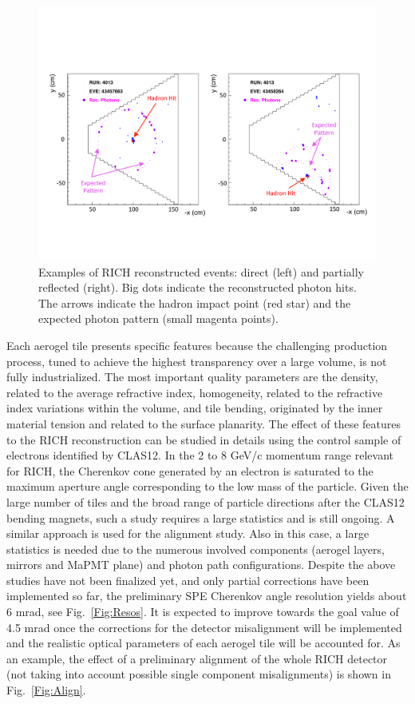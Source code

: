 \documentclass[final,5p,times,twocolumn]{elsarticle}
\def\MAPMT{MaPMT }
\begin{document}
\begin{figure}[t]
\begin{center}
\includegraphics[width=1.0\columnwidth]{EPS/Figure7.pdf}
\end{center}
\caption{Examples of RICH reconstructed events: direct (left) and partially reflected (right). Big dots indicate
the reconstructed photon hits. The arrows indicate
the hadron impact point (red star) and the expected photon pattern (small magenta points).}
\label{Fig:Events}
\end{figure}

Each aerogel tile presents specific features because the challenging production process, tuned to achieve
the highest transparency over a large volume, is not fully industrialized. The most important quality 
parameters are the density, related to the average refractive index, homogeneity, related to the 
refractive index variations within the volume, and tile bending, originated by the inner material tension 
and related to the surface planarity. The effect of these features to the RICH reconstruction can 
be studied in details using the control sample of electrons identified by CLAS12. In the 2 to 8 GeV/c 
momentum range relevant for RICH, the Cherenkov cone generated by an electron is saturated to the maximum 
aperture angle corresponding to the low mass of the particle. Given the large number of tiles and the
broad range of particle directions after the CLAS12 bending magnets, such a study requires a large
statistics and is still ongoing. A similar approach is used for the alignment study. Also in this case,
a large statistics is needed due to the numerous involved components (aerogel layers, mirrors and \MAPMT
plane) and photon path configurations. Despite the above studies have not been finalized yet, and
only partial corrections have been implemented so far, the
preliminary SPE Cherenkov angle resolution yields about 6 mrad, see Fig.~\ref{Fig:Resos}. It is expected 
to improve towards the goal value of 4.5 mrad once the corrections for the detector misalignment will
be implemented and the realistic optical parameters of each aerogel tile will be accounted for. 
As an example, the effect of a preliminary alignment of the whole RICH detector (not taking into 
account possible single component misalignments) is shown in Fig.~\ref{Fig:Align}.
\end{document}
